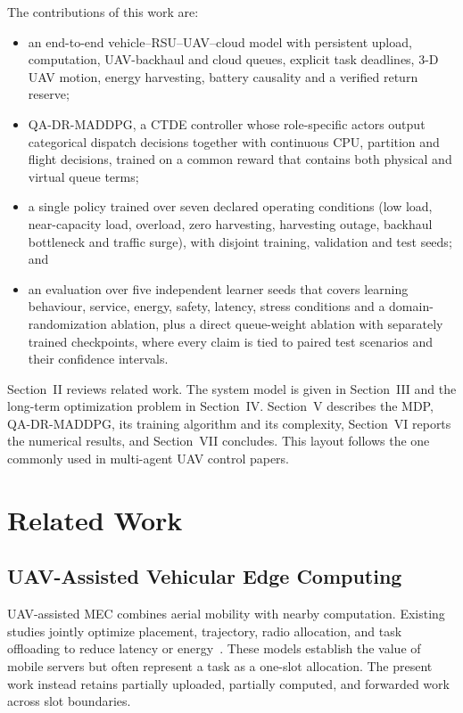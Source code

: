 \documentclass[journal]{IEEEtran}
\newcommand{\method}{QA-DR-MADDPG}
\begin{document}
The contributions of this work are:
\begin{itemize}
  \item an end-to-end vehicle--RSU--UAV--cloud model with persistent upload,
  computation, UAV-backhaul and cloud queues, explicit task deadlines, 3-D
  UAV motion, energy harvesting, battery causality and a verified return
  reserve;
  \item \method, a CTDE controller whose role-specific actors output
  categorical dispatch decisions together with continuous CPU, partition and
  flight decisions, trained on a common reward that contains both physical
  and virtual queue terms;
  \item a single policy trained over seven declared operating conditions
  (low load, near-capacity load, overload, zero harvesting, harvesting outage,
  backhaul bottleneck and traffic surge), with disjoint training, validation
  and test seeds; and
  \item an evaluation over five independent learner seeds that covers
  learning behaviour, service, energy, safety, latency, stress conditions and
  a domain-randomization ablation, plus a direct queue-weight ablation with
  separately trained checkpoints, where every claim is tied to paired test
  scenarios and their confidence intervals.
\end{itemize}

Section~II reviews related work. The system model is given in Section~III
and the long-term optimization problem in Section~IV. Section~V describes the
MDP, \method, its training algorithm and its complexity, Section~VI reports
the numerical results, and Section~VII concludes. This layout follows the one
commonly used in multi-agent UAV control papers.


\iffalse
\section{Related Work}
\subsection{UAV-Assisted Vehicular Edge Computing}
UAV-assisted MEC combines aerial mobility with nearby computation. Existing
studies jointly optimize placement, trajectory, radio allocation, and task
offloading to reduce latency or energy~\cite{zhang2019mobile,liu2020uav}.
These models establish the value of mobile servers but often represent a task
as a one-slot allocation. The present work instead retains partially uploaded,
partially computed, and forwarded work across slot boundaries.
\end{document}
